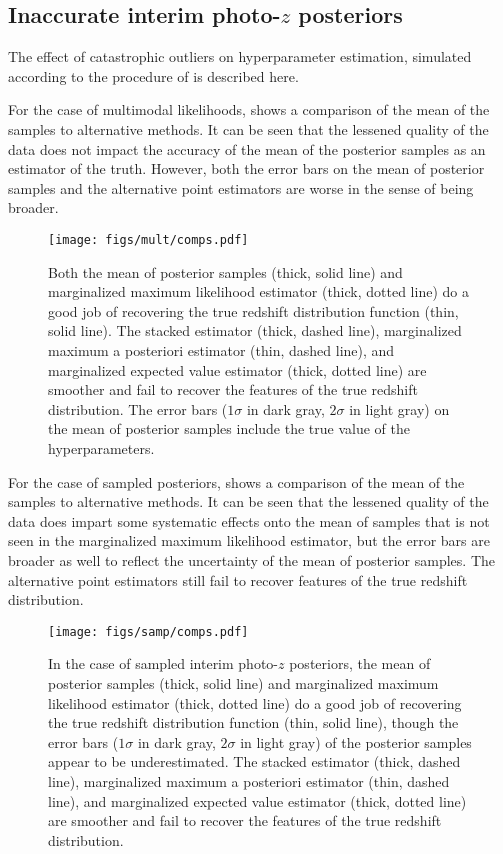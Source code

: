 \subsection{Inaccurate interim photo-$z$ posteriors}

The effect of catastrophic outliers on hyperparameter estimation, simulated according to the procedure of  is described here.  

For the case of multimodal likelihoods,  shows a comparison of the mean of the samples to alternative methods.  
It can be seen that the lessened quality of the data does not impact the accuracy of the mean of the posterior samples as an estimator of the truth.  
However, both the error bars on the mean of posterior samples and the alternative point estimators are worse in the sense of being broader.

\begin{figure}
	\texttt{[image: figs/mult/comps.pdf]}
	\caption{Both the mean of posterior samples (thick, solid line) and marginalized maximum likelihood estimator (thick, dotted line) do a good job of recovering the true redshift distribution function (thin, solid line).  
		The stacked estimator (thick, dashed line), marginalized maximum a posteriori estimator (thin, dashed line), and marginalized expected value estimator (thick, dotted line) are smoother and fail to recover the features of the true redshift distribution.  
		The error bars ($1\sigma$ in dark gray, $2\sigma$ in light gray) on the mean of posterior samples include the true value of the hyperparameters.}
\end{figure}

For the case of sampled posteriors,  shows a comparison of the mean of the samples to alternative methods.  
It can be seen that the lessened quality of the data does impart some systematic effects onto the mean of samples that is not seen in the marginalized maximum likelihood estimator, but the error bars are broader as well to reflect the uncertainty of the mean of posterior samples.  
The alternative point estimators still fail to recover features of the true redshift distribution.

\begin{figure}
	\texttt{[image: figs/samp/comps.pdf]}
	\caption{In the case of sampled interim photo-$z$ posteriors, the mean of posterior samples (thick, solid line) and marginalized maximum likelihood estimator (thick, dotted line) do a good job of recovering the true redshift distribution function (thin, solid line), though the error bars ($1\sigma$ in dark gray, $2\sigma$ in light gray) of the posterior samples appear to be underestimated.  
		The stacked estimator (thick, dashed line), marginalized maximum a posteriori estimator (thin, dashed line), and marginalized expected value estimator (thick, dotted line) are smoother and fail to recover the features of the true redshift distribution.}
\end{figure}

